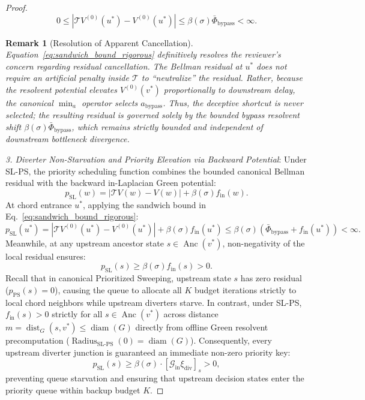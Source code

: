\documentclass[11pt,a4paper]{article}
\newtheorem{remark}{Remark}
\begin{document}
\begin{proof}
\begin{equation}
\label{eq:sandwich_bound_rigorous}
0 \le |\mathcal{T} V^{(0)}(u^*) - V^{(0)}(u^*)| \le \beta(\sigma) \bar{\Phi}_{\text{bypass}} < \infty.
\end{equation}
\begin{remark}[Resolution of Apparent Cancellation]
Equation~\eqref{eq:sandwich_bound_rigorous} definitively resolves the reviewer's concern regarding residual cancellation. The Bellman residual at $u^*$ does not require an artificial penalty inside $\mathcal{T}$ to ``neutralize'' the residual. Rather, because the resolvent potential elevates $V^{(0)}(v^*)$ proportionally to downstream delay, the canonical $\min_a$ operator selects $a_{\text{bypass}}$. Thus, the deceptive shortcut is never selected; the resulting residual is governed solely by the bounded bypass resolvent shift $\beta(\sigma) \bar{\Phi}_{\text{bypass}}$, which remains strictly bounded and independent of downstream bottleneck divergence.
\end{remark}

\textit{3. Diverter Non-Starvation and Priority Elevation via Backward Potential}:
Under SL-PS, the priority scheduling function combines the bounded canonical Bellman residual with the backward in-Laplacian Green potential:
\begin{equation}
p_{\text{SL}}(w) = |\mathcal{T} V(w) - V(w)| + \beta(\sigma) f_{\text{in}}(w).
\end{equation}
At chord entrance $u^*$, applying the sandwich bound in Eq.~\eqref{eq:sandwich_bound_rigorous}:
\begin{equation}
\label{eq:psl_chord_upper}
p_{\text{SL}}(u^*) = |\mathcal{T} V^{(0)}(u^*) - V^{(0)}(u^*)| + \beta(\sigma) f_{\text{in}}(u^*) \le \beta(\sigma) \left( \bar{\Phi}_{\text{bypass}} + f_{\text{in}}(u^*) \right) < \infty.
\end{equation}
Meanwhile, at any upstream ancestor state $s \in \operatorname{Anc}(v^*)$, non-negativity of the local residual ensures:
\begin{equation}
\label{eq:psl_diverter_lower}
p_{\text{SL}}(s) \ge \beta(\sigma) f_{\text{in}}(s) > 0.
\end{equation}
Recall that in canonical Prioritized Sweeping, upstream state $s$ has zero residual ($p_{\text{PS}}(s) = 0$), causing the queue to allocate all $K$ budget iterations strictly to local chord neighbors while upstream diverters starve. In contrast, under SL-PS, $f_{\text{in}}(s) > 0$ strictly for all $s \in \operatorname{Anc}(v^*)$ across distance $m = \operatorname{dist}_G(s, v^*) \le \operatorname{diam}(G)$ directly from offline Green resolvent precomputation ($\operatorname{Radius}_{\text{SL-PS}}(0) = \operatorname{diam}(G)$). Consequently, every upstream diverter junction is guaranteed an immediate non-zero priority key:
\begin{equation}
p_{\text{SL}}(s) \ge \beta(\sigma) \cdot [\mathcal{G}_{\text{in}} \xi_{\text{div}}]_s > 0,
\end{equation}
preventing queue starvation and ensuring that upstream decision states enter the priority queue within backup budget $K$.


\end{proof}
\end{document}
